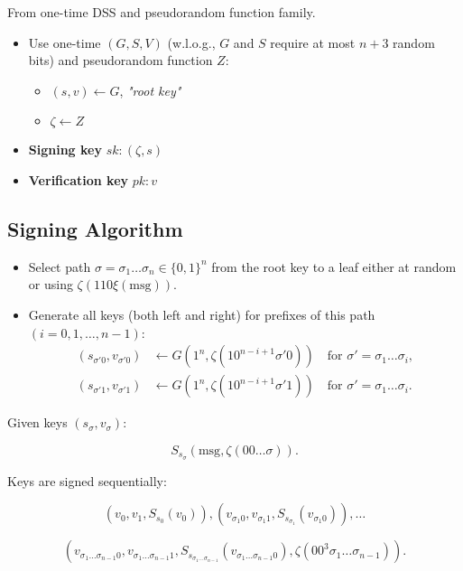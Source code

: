From one-time DSS and pseudorandom function family.

\begin{itemize}
    \item Use one-time $(G, S, V)$ (w.l.o.g., $G$ and $S$ require at most $n + 3$ random bits) and pseudorandom function $Z$:
    \begin{itemize}
        \item $(s, v) \leftarrow G$, \textit{"root key"}
        \item $\zeta \leftarrow Z$
    \end{itemize}
    \item \textbf{Signing key} $sk: (\zeta, s)$
    \item \textbf{Verification key} $pk: v$
\end{itemize}

\subsection{Signing Algorithm}

\begin{itemize}
    \item Select path $\sigma = \sigma_1 \dots \sigma_n \in \{0,1\}^n$ from the root key to a leaf either at random or using $\zeta(110\xi(\text{msg}))$.
    \item Generate all keys (both left and right) for prefixes of this path $(i = 0,1,\dots,n-1)$:
    \begin{align*}
        (s_{\sigma'0}, v_{\sigma'0}) &\leftarrow G(1^n, \zeta(10^{n-i+1}\sigma'0)) \quad \text{for } \sigma' = \sigma_1\dots\sigma_i,\\
        (s_{\sigma'1}, v_{\sigma'1}) &\leftarrow G(1^n, \zeta(10^{n-i+1}\sigma'1)) \quad \text{for } \sigma' = \sigma_1\dots\sigma_i.
    \end{align*}
\end{itemize}

Given keys $(s_{\sigma}, v_{\sigma})$:

\[
S_{s_{\sigma}}(\text{msg}, \zeta(00\dots\sigma)).
\]

Keys are signed sequentially:

\[
(v_0, v_1, S_{s_0}(v_0)), (v_{\sigma_1 0}, v_{\sigma_1 1}, S_{s_{\sigma_1}}(v_{\sigma_1 0})), \dots
\]

\[
(v_{\sigma_1\dots\sigma_{n-1} 0}, v_{\sigma_1\dots\sigma_{n-1} 1}, S_{s_{\sigma_1\dots\sigma_{n-1}}}(v_{\sigma_1\dots\sigma_{n-1} 0}), \zeta(00^3 \sigma_1\dots\sigma_{n-1})).
\]


